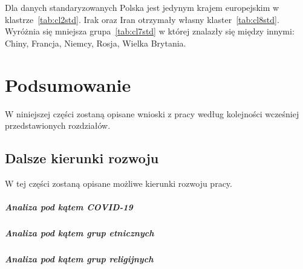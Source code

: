 \documentclass[11pt]{report}
\begin{document}
    Dla danych standaryzowanych Polska jest jedynym krajem europejskim w klastrze~\ref{tab:cl2std}.
    Irak oraz Iran otrzymały własny klaster~\ref{tab:cl8std}.
    Wyróżnia się mniejsza grupa~\ref{tab:cl7std} w której znalazły się między innymi: Chiny, Francja, Niemcy, Rosja, Wielka Brytania.


    \chapter{Podsumowanie}
    W niniejszej części zostaną opisane wnioski z pracy według kolejności wcześniej przedstawionych rozdziałów.


    \section{Dalsze kierunki rozwoju}
    W tej części zostaną opisane możliwe kierunki rozwoju pracy.

    \paragraph{Analiza pod kątem COVID-19}

    \paragraph{Analiza pod kątem grup etnicznych}

    \paragraph{Analiza pod kątem grup religijnych}



    \newpage
    \printbibliography[title={Bibliografia}]
\end{document}
